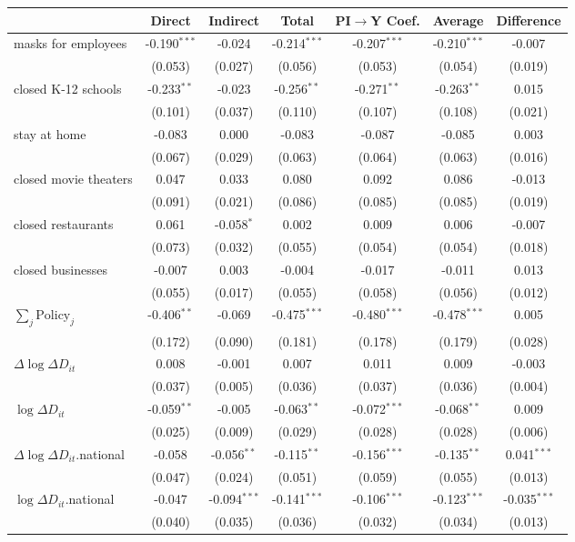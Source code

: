 
\begin{tabular}{lccccc|>{}c}
\toprule
  & Direct & Indirect & Total & PI$\to$Y Coef. & Average & Difference\\
\midrule
masks for employees & -0.190$^{***}$ & -0.024 & -0.214$^{***}$ & -0.207$^{***}$ & -0.210$^{***}$ & -0.007\\
 & (0.053) & (0.027) & (0.056) & (0.053) & (0.054) & (0.019)\\
closed K-12 schools & -0.233$^{**}$ & -0.023 & -0.256$^{**}$ & -0.271$^{**}$ & -0.263$^{**}$ & 0.015\\
 & (0.101) & (0.037) & (0.110) & (0.107) & (0.108) & (0.021)\\
stay at home & -0.083 & 0.000 & -0.083 & -0.087 & -0.085 & 0.003\\
 & (0.067) & (0.029) & (0.063) & (0.064) & (0.063) & (0.016)\\
closed movie theaters & 0.047 & 0.033 & 0.080 & 0.092 & 0.086 & -0.013\\
 & (0.091) & (0.021) & (0.086) & (0.085) & (0.085) & (0.019)\\
closed restaurants & 0.061 & -0.058$^{*}$ & 0.002 & 0.009 & 0.006 & -0.007\\
 & (0.073) & (0.032) & (0.055) & (0.054) & (0.054) & (0.018)\\
closed businesses & -0.007 & 0.003 & -0.004 & -0.017 & -0.011 & 0.013\\
 & (0.055) & (0.017) & (0.055) & (0.058) & (0.056) & (0.012)\\
$\sum_j \mathrm{Policy}_j$ & -0.406$^{**}$ & -0.069 & -0.475$^{***}$ & -0.480$^{***}$ & -0.478$^{***}$ & 0.005\\
 & (0.172) & (0.090) & (0.181) & (0.178) & (0.179) & (0.028)\\
$\Delta \log \Delta D_{it}$ & 0.008 & -0.001 & 0.007 & 0.011 & 0.009 & -0.003\\
 & (0.037) & (0.005) & (0.036) & (0.037) & (0.036) & (0.004)\\
$\log \Delta D_{it}$ & -0.059$^{**}$ & -0.005 & -0.063$^{**}$ & -0.072$^{***}$ & -0.068$^{**}$ & 0.009\\
 & (0.025) & (0.009) & (0.029) & (0.028) & (0.028) & (0.006)\\
$\Delta \log \Delta D_{it}$.national & -0.058 & -0.056$^{**}$ & -0.115$^{**}$ & -0.156$^{***}$ & -0.135$^{**}$ & 0.041$^{***}$\\
 & (0.047) & (0.024) & (0.051) & (0.059) & (0.055) & (0.013)\\
$\log \Delta D_{it}$.national & -0.047 & -0.094$^{***}$ & -0.141$^{***}$ & -0.106$^{***}$ & -0.123$^{***}$ & -0.035$^{***}$\\
 & (0.040) & (0.035) & (0.036) & (0.032) & (0.034) & (0.013)\\
\bottomrule
\end{tabular}
